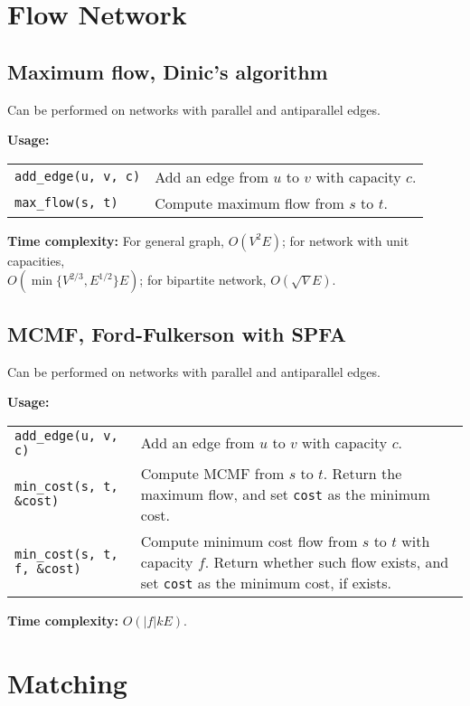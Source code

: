 \section{Flow Network}
\subsection{Maximum flow, Dinic's algorithm}
\Tick Can be performed on networks with parallel and antiparallel edges.\par
\textbf{Usage:} \\[0.1cm]
\begin{tabular}{p{3.5cm} p{8cm}}
  \lstinline|add_edge(u, v, c)| & Add an edge from $u$ to $v$ with capacity $c$. \\
  \lstinline|max_flow(s, t)| & Compute maximum flow from $s$ to $t$. \\
\end{tabular} \par
\textbf{Time complexity:} For general graph, $O(V^2E)$; for network with unit capacities, \\ $O(\min\{V^{2/3}, E^{1/2}\}E)$; for bipartite network, $O(\sqrt{V}E)$. \par


\subsection{MCMF, Ford-Fulkerson with SPFA}
\Tick Can be performed on networks with parallel and antiparallel edges.\par
\textbf{Usage:} \\[0.1cm]
\begin{tabular}{p{4.5cm} p{7cm}}
  \lstinline|add_edge(u, v, c)| & Add an edge from $u$ to $v$ with capacity $c$. \\
  \lstinline|min_cost(s, t, &cost)| & Compute MCMF from $s$ to $t$. Return the maximum flow, and set \lstinline|cost| as the minimum cost. \\
  \lstinline|min_cost(s, t, f, &cost)| & Compute minimum cost flow from $s$ to $t$ with capacity $f$. Return whether such flow exists, and set \lstinline|cost| as the minimum cost, if exists. \\
\end{tabular} \par
\textbf{Time complexity:} $O(|f|kE)$. \par


\section{Matching}
